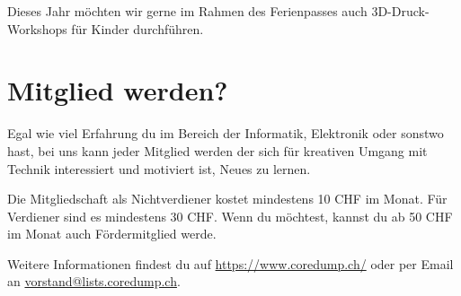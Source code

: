 \documentclass[10pt,a4paper,parskip,fleqn]{scrartcl}
\begin{document}
Dieses Jahr möchten wir gerne im Rahmen des Ferienpasses auch 3D-Druck-Workshops
für Kinder durchführen.

\section{Mitglied werden?}

Egal wie viel Erfahrung du im Bereich der Informatik, Elektronik oder sonstwo
hast, bei uns kann jeder Mitglied werden der sich für kreativen Umgang mit
Technik interessiert und motiviert ist, Neues zu lernen.

Die Mitgliedschaft als Nichtverdiener kostet mindestens 10 CHF im Monat. Für
Verdiener sind es mindestens 30 CHF. Wenn du möchtest, kannst du ab 50 CHF im
Monat auch Fördermitglied werde.

Weitere Informationen findest du auf \url{https://www.coredump.ch/} oder per
Email an \url{vorstand@lists.coredump.ch}.


%
%


% 
% 
\end{document}
